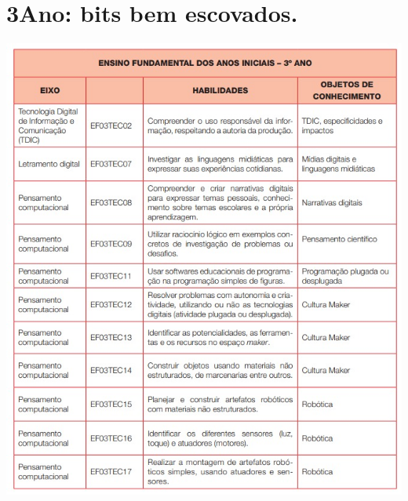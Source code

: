\chapter[ 3\textordmasculine\space Ano: bits bem escovados.]{3\textordmasculine\space Ano: bits bem escovados.}



\pagebreak

\begin{center}
	\includegraphics[height=\textheight]{./IMG/ano-3.jpeg}
\end{center}

\pagebreak

%

\pagebreak

